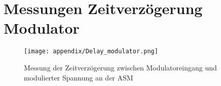 

% 


%


\clearpage
\section{Messungen Zeitverzögerung Modulator}\label{app:Messungen_Delay Modulator}



\begin{figure}[H]
	\centering
	\texttt{[image: appendix/Delay\_modulator.png]}
	\caption{Messung der Zeitverzögerung zwischen Modulatoreingang und modulierter Spannung an der ASM}
	\label{fig:app_delay}
\end{figure}











% 


